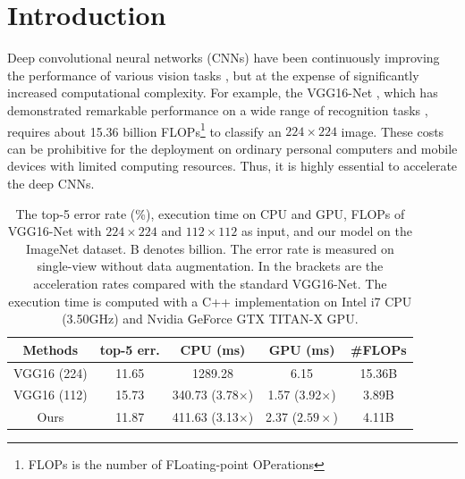 \documentclass[letterpaper]{article} %
\begin{document}
\section{Introduction}
Deep convolutional neural networks (CNNs) \cite{lecun1990handwritten,krizhevsky2012imagenet} have been continuously improving the performance of various vision tasks \cite{simonyan2014very,he2016deep,long2015fully,lin2017cross,chen2016disc,chen2016deep}, but at the expense of significantly increased computational complexity. For example, the VGG16-Net \cite{simonyan2014very}, which has demonstrated remarkable performance on a wide range of recognition tasks \cite{long2015fully,ren2015faster,wang2017multi}, requires about 15.36 billion FLOPs\footnote{FLOPs is the number of FLoating-point OPerations} to classify an $224 \times 224$ image. These costs can be prohibitive for the deployment on ordinary personal computers and mobile devices with limited computing resources. Thus, it is highly essential to accelerate the deep CNNs.

\begin{table}[!t]
\centering
\scriptsize
\begin{tabular}{c|c|c|c|c}
\hline
\centering  Methods  & top-5 err.  & CPU (ms) & GPU (ms)  & \#FLOPs\\
\hline
\hline
VGG16 (224)  & 11.65  & 1289.28 & 6.15 & 15.36B \\
VGG16 (112)    &  15.73 & 340.73  (3.78$\times$) &  1.57 (3.92$\times$) & 3.89B\\
Ours   & 11.87  &   411.63 (3.13$\times$) & 2.37 ($2.59\times$) & 4.11B \\
\hline
\end{tabular}
\caption{The top-5 error rate (\%), execution time on CPU and GPU, FLOPs of VGG16-Net with $224 \times 224$ and $112 \times 112$ as input, and our model on the ImageNet dataset. B denotes billion. The error rate is measured on single-view without data augmentation. In the brackets are the acceleration rates compared with the standard VGG16-Net. The execution time is computed with a C++ implementation on Intel i7 CPU (3.50GHz) and Nvidia GeForce GTX TITAN-X GPU.}
\label{table:different_input}
\vspace{-8pt}
\end{table}
\end{document}
